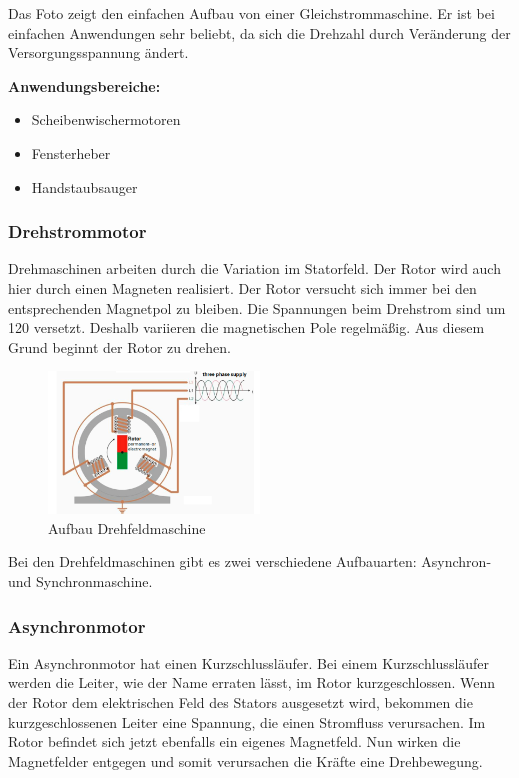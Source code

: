 Das Foto zeigt den einfachen Aufbau von einer Gleichstrommaschine. Er ist bei einfachen Anwendungen sehr beliebt, da sich die Drehzahl durch Veränderung der Versorgungsspannung ändert.\newline

\textbf{Anwendungsbereiche:}

\begin{itemize}
	\item{Scheibenwischermotoren}
	\item{Fensterheber}
	\item{Handstaubsauger}
\end{itemize}

\subsubsection{Drehstrommotor}
\label{sec:drehstrom}

Drehmaschinen arbeiten durch die Variation im Statorfeld. Der Rotor wird auch hier durch einen Magneten realisiert. Der Rotor versucht sich immer bei den entsprechenden Magnetpol zu bleiben. Die Spannungen beim Drehstrom sind um 120 versetzt. Deshalb variieren die magnetischen Pole regelmäßig. Aus diesem Grund beginnt der Rotor zu drehen.

\begin{figure}[!ht]
\begin{center}
	\caption{Aufbau Drehfeldmaschine}
	\includegraphics[width=0.5\textwidth]{Drehstrommotor}
\end{center}
\end{figure}

Bei den Drehfeldmaschinen gibt es zwei verschiedene Aufbauarten: Asynchron- und Synchronmaschine.

\subsubsection{Asynchronmotor}
\label{sec:asynchronmotor}

Ein Asynchronmotor hat einen Kurzschlussläufer.
Bei einem Kurzschlussläufer werden die Leiter, wie der Name erraten lässt, im Rotor kurzgeschlossen. Wenn der Rotor dem elektrischen Feld des Stators ausgesetzt wird, bekommen die kurzgeschlossenen Leiter eine Spannung, die einen Stromfluss verursachen. Im Rotor befindet sich jetzt ebenfalls ein eigenes Magnetfeld. Nun wirken die Magnetfelder entgegen und somit verursachen die Kräfte eine Drehbewegung. 

